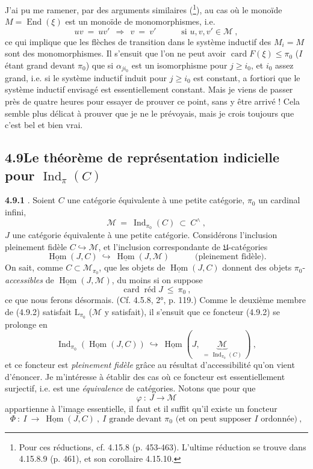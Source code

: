 \documentclass[11pt]{article}
\newcommand{\printedpage}[1]{\marginpar{\footnotesize p.~#1}}
\newcommand{\msp}[1]{\marginpar{\footnotesize [#1]}}
\newcommand{\Ind}{\operatorname{Ind}}
\newcommand{\card}{\operatorname{card}}
\newcommand{\red}{\operatorname{\text{réd}}}
\newcommand{\uHom}{\underline{\operatorname{Hom}}}
\newcommand{\End}{\operatorname{End}}
\newcommand{\cM}{\mathcal{M}}
\begin{document}
\msp{page 216}

J'ai pu me ramener, par des arguments similaires (\footnote[92]{Pour ces réductions, cf. 4.15.8 (p. 453-463). L'ultime réduction se trouve dans 4.15.8.9 (p. 461), et son corollaire 4.15.10.}), au cas où le monoïde $M = \End(\xi)$ est un monoïde de monomorphismes, i.e.
\[
uv \ = \ uv' \ \ \Longrightarrow\ \ v \ = \ v' \qquad\quad \text{si } u, v, v' \in \cM\ ,
\] %
ce qui implique que les flèches de transition dans le système inductif des $M_i = M$ sont des monomorphismes. Il s'ensuit que l'on ne peut avoir $\card F(\xi) \leqslant \pi_0$ ($I$ étant grand devant $\pi_0$) que si $\alpha_{ji_0}$ est un isomorphisme pour $j \geqslant i_0$, et $i_0$ assez grand, i.e. si le système inductif induit pour $j \geqslant i_0$ est constant, a fortiori que le système inductif envisagé est essentiellement constant. Mais je viens de passer près de quatre heures pour essayer de prouver ce point, sans y être arrivé ! Cela semble plus délicat à prouver que je ne le prévoyais, mais je crois toujours que c'est bel et bien vrai.

\msp{page 217}

\subsection*{4.9\quad Le théorème de représentation indicielle pour $\Ind_{\pi}(C)$}

\textbf{4.9.1} . Soient $C$ une catégorie équivalente à une petite catégorie, $\pi_0$ un cardinal infini,
\[
\cM \ = \ \Ind_{\pi_0}(C) \ \subset\ C^{\wedge}\ , \tag*{(4.9.1)}
\]
$J$ une catégorie équivalente à une petite catégorie. Considérons l'inclusion pleinement fidèle $C \hookrightarrow \cM$, et l'inclusion correspondante de $\mathfrak{U}$-catégories
\[
\uHom(J, C) \ \hookrightarrow\ \uHom(J, \cM) \qquad\quad \text{(pleinement fidèle).} \tag*{(4.9.2)}
\]
On sait, comme $C \subset \cM_{\pi_0}$, que les objets de $\uHom(J, C)$ donnent des objets $\pi_0$-\textit{accessibles} de $\uHom(J, \cM)$, du moins si on suppose
\[
\card\red J \ \leqslant\ \pi_0\ , \tag*{(4.9.3)}
\]
ce que nous ferons désormais. (Cf. 4.5.8, 2°, p. 119.) Comme le deuxième membre de (4.9.2) satisfait $\mathrm{L}_{\pi_0}$ ($\cM$ y satisfait), il s'ensuit que ce foncteur (4.9.2) se prolonge en
\[
\Ind_{\pi_0}(\uHom(J, C)) \ \hookrightarrow\ \uHom(J,\ \underbrace{\cM}_{=\,\Ind_{\pi_0}(C)}\ )\ , \tag*{(4.9.3)}
\]
\printedpage{78}
et ce foncteur est \textit{pleinement fidèle} grâce au résultat d'accessibilité qu'on vient d'énoncer. Je m'intéresse à établir des cas où ce foncteur est essentiellement surjectif, i.e. est une \textit{équivalence} de catégories. Notons que pour que
\[
\varphi \ :\ J \longrightarrow \cM
\]
appartienne à l'image essentielle, il faut et il suffit qu'il existe un foncteur
\[
\Phi \ :\ I \ \longrightarrow\ \uHom(J, C)\ ,\ I \text{ grande devant } \pi_0 \text{ (et on peut supposer } I \text{ ordonnée)}\ , \tag*{(4.9.4)}
\]
\end{document}
